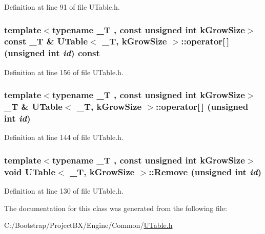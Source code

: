 Definition at line 91 of file UTable.h.\hypertarget{class_u_table_3cf8eac3500402b6f4badba5c1b7fab4}{
\subsubsection[{operator[]}]{\setlength{\rightskip}{0pt plus 5cm}template$<$typename \_\-T , const unsigned int kGrowSize$>$ const \_\-T \& {\bf UTable}$<$ \_\-T, kGrowSize $>$::operator\mbox{[}$\,$\mbox{]} (unsigned int {\em id}) const}}
\label{class_u_table_3cf8eac3500402b6f4badba5c1b7fab4}




Definition at line 156 of file UTable.h.\hypertarget{class_u_table_9b6aee18e0280b058fca5b3c5b59b98c}{
\subsubsection[{operator[]}]{\setlength{\rightskip}{0pt plus 5cm}template$<$typename \_\-T , const unsigned int kGrowSize$>$ \_\-T \& {\bf UTable}$<$ \_\-T, kGrowSize $>$::operator\mbox{[}$\,$\mbox{]} (unsigned int {\em id})}}
\label{class_u_table_9b6aee18e0280b058fca5b3c5b59b98c}




Definition at line 144 of file UTable.h.\hypertarget{class_u_table_2009dc81fe70d8cef0077e666845e6e1}{
\subsubsection[{Remove}]{\setlength{\rightskip}{0pt plus 5cm}template$<$typename \_\-T , const unsigned int kGrowSize$>$ void {\bf UTable}$<$ \_\-T, kGrowSize $>$::Remove (unsigned int {\em id})}}
\label{class_u_table_2009dc81fe70d8cef0077e666845e6e1}




Definition at line 130 of file UTable.h.

The documentation for this class was generated from the following file:\begin{CompactItemize}
\item 
C:/Bootstrap/ProjectBX/Engine/Common/\hyperlink{_u_table_8h}{UTable.h}\end{CompactItemize}
